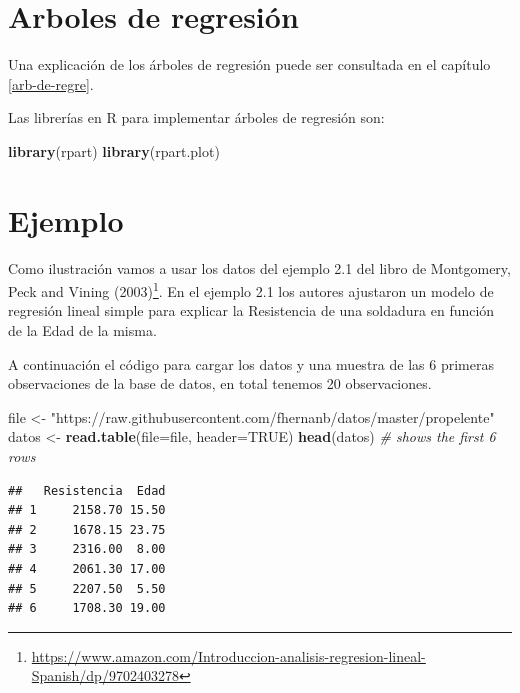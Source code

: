 \documentclass[]{book}
\makeatletter
\newenvironment{Shaded}{\begin{snugshade}}{\end{snugshade}}
\newcommand{\CommentTok}[1]{\textcolor[rgb]{0.56,0.35,0.01}{\textit{#1}}}
\newcommand{\DataTypeTok}[1]{\textcolor[rgb]{0.13,0.29,0.53}{#1}}
\newcommand{\KeywordTok}[1]{\textcolor[rgb]{0.13,0.29,0.53}{\textbf{#1}}}
\newcommand{\NormalTok}[1]{#1}
\newcommand{\OtherTok}[1]{\textcolor[rgb]{0.56,0.35,0.01}{#1}}
\newcommand{\StringTok}[1]{\textcolor[rgb]{0.31,0.60,0.02}{#1}}
\let\rmarkdownfootnote\footnote%
\def\footnote{\protect\rmarkdownfootnote}
\renewcommand{\href}[2]{#2\footnote{\url{#1}}}
\newenvironment{kframe}{%
\medskip{}
\setlength{\fboxsep}{.8em}
 \def\at@end@of@kframe{}%
 \ifinner\ifhmode%
  \def\at@end@of@kframe{\end{minipage}}%
  \begin{minipage}{\columnwidth}%
 \fi\fi%
 \def\FrameCommand##1{\hskip\@totalleftmargin \hskip-\fboxsep
 \colorbox{shadecolor}{##1}\hskip-\fboxsep
     \hskip-\linewidth \hskip-\@totalleftmargin \hskip\columnwidth}%
 \MakeFramed {\advance\hsize-\width
   \@totalleftmargin\z@ \linewidth\hsize
   \@setminipage}}%
 {\par\unskip\endMakeFramed%
 \at@end@of@kframe}
\renewenvironment{Shaded}{\begin{kframe}}{\end{kframe}}
\makeatother
\begin{document}
\hypertarget{arboles-de-regresion}{%
\section*{Arboles de regresión}\label{arboles-de-regresion}}

Una explicación de los árboles de regresión puede ser consultada en el capítulo \ref{arb-de-regre}.

Las librerías en R para implementar árboles de regresión son:

\begin{Shaded}
\begin{Highlighting}[]
\KeywordTok{library}\NormalTok{(rpart)}
\KeywordTok{library}\NormalTok{(rpart.plot)}
\end{Highlighting}
\end{Shaded}

\hypertarget{ejemplo}{%
\section*{Ejemplo}\label{ejemplo}}

Como ilustración vamos a usar los datos del ejemplo 2.1 del libro de \href{https://www.amazon.com/Introduccion-analisis-regresion-lineal-Spanish/dp/9702403278}{Montgomery, Peck and Vining (2003)}. En el ejemplo 2.1 los autores ajustaron un modelo de regresión lineal simple para explicar la Resistencia de una soldadura en función de la Edad de la misma.

A continuación el código para cargar los datos y una muestra de las 6 primeras observaciones de la base de datos, en total tenemos 20 observaciones.

\begin{Shaded}
\begin{Highlighting}[]
\NormalTok{file <-}\StringTok{ "https://raw.githubusercontent.com/fhernanb/datos/master/propelente"}
\NormalTok{datos <-}\StringTok{ }\KeywordTok{read.table}\NormalTok{(}\DataTypeTok{file=}\NormalTok{file, }\DataTypeTok{header=}\OtherTok{TRUE}\NormalTok{)}
\KeywordTok{head}\NormalTok{(datos) }\CommentTok{# shows the first 6 rows}
\end{Highlighting}
\end{Shaded}

\begin{verbatim}
##   Resistencia  Edad
## 1     2158.70 15.50
## 2     1678.15 23.75
## 3     2316.00  8.00
## 4     2061.30 17.00
## 5     2207.50  5.50
## 6     1708.30 19.00
\end{verbatim}
\end{document}
